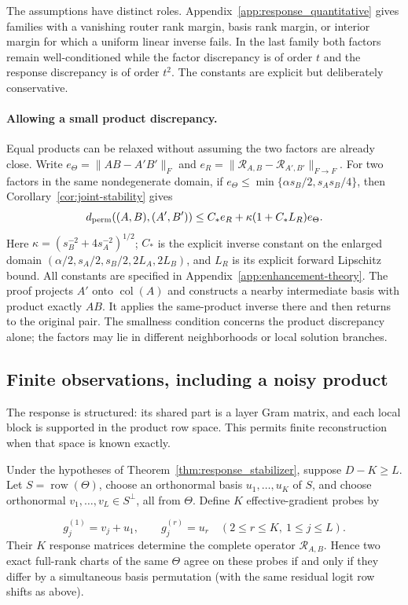 The assumptions have distinct roles. Appendix~\ref{app:response_quantitative}
gives families with a vanishing router rank margin, basis rank margin,
or interior margin for which a uniform linear inverse fails. In the last
family both factors remain well-conditioned while the factor discrepancy
is of order $t$ and the response discrepancy is of order $t^2$.
The constants are explicit but deliberately conservative.

\paragraph{Allowing a small product discrepancy.}
Equal products can be relaxed without assuming the two factors are already
close. Write $e_\Theta=\|AB-A'B'\|_F$ and
$e_R=\|\mathcal R_{A,B}-\mathcal R_{A',B'}\|_{F\to F}$.
For two factors in the same nondegenerate domain, if
$e_\Theta\le\min\{\alpha s_B/2,s_As_B/4\}$, then
Corollary~\ref{cor:joint-stability} gives
\begin{equation}
 d_{\rm perm}((A,B),(A',B'))
 \le C_*e_R+\kappa(1+C_*L_R)e_\Theta.
 \label{eq:joint-main}
\end{equation}
Here $\kappa=(s_B^{-2}+4s_A^{-2})^{1/2}$; $C_*$ is the explicit inverse
constant on the enlarged domain
$(\alpha/2,s_A/2,s_B/2,2L_A,2L_B)$, and $L_R$ is its explicit forward
Lipschitz bound. All constants are specified in
Appendix~\ref{app:enhancement-theory}.
The proof projects $A'$ onto $\operatorname{col}(A)$ and constructs a nearby
intermediate basis with product exactly $AB$. It applies the same-product
inverse there and then returns to the original pair.
The smallness condition concerns the product discrepancy alone; the factors
may lie in different neighborhoods or local solution branches.

\subsection{Finite observations, including a noisy product}
\label{sec:finite-observations}

The response is structured: its shared part is a layer Gram matrix, and
each local block is supported in the product row space. This permits
finite reconstruction when that space is known exactly.

\begin{corollary}
\label{cor:response_tomography}
Under the hypotheses of Theorem~\ref{thm:response_stabilizer}, suppose
$D-K\ge L$.  Let $S=\operatorname{row}(\Theta)$, choose an orthonormal
basis $u_1,\ldots,u_K$ of $S$, and choose orthonormal
$v_1,\ldots,v_L\in S^\perp$, all from \(\Theta\).  Define $K$ effective-gradient
probes by

\[
 g_j^{(1)}=v_j+u_1,
 \qquad
 g_j^{(r)}=u_r\quad(2\le r\le K,\ 1\le j\le L).
\]
Their $K$ response matrices determine the complete operator
$\mathcal R_{A,B}$.  Hence two exact full-rank charts of the same \(\Theta\)
agree on these probes if and only if they differ by a simultaneous basis
permutation (with the same residual logit row shifts as above).
\end{corollary}



